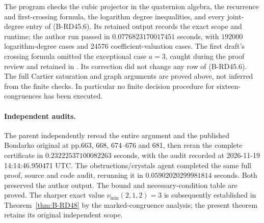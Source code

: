 \begin{remark}
The program 
checks the cubic projector in the quaternion algebra, the
recurrence and first-crossing formula, the logarithm degree
inequalities, and every joint-degree entry of (B-RD45.6).
Its retained output records the exact scope and runtime; the
author run passed in $0.0776823170017451$ seconds, with
$192000$ logarithm-degree cases and $24576$ coefficient-valuation
cases. The first draft's crossing formula omitted the exceptional
case $a=3$, caught during the proof review and retained in
.
Its correction did not change any row of (B-RD45.6).
The full Cartier saturation and graph arguments are proved
above, not inferred from the finite checks. In particular
no finite decision procedure for sixteen-congruences has
been executed.
\end{remark}

\paragraph{Independent audits.}
The parent independently reread the entire argument and the published
Bondarko original at pp.663, 668, 674--676 and 681, then reran the
complete certificate in $0.23222537100082263$ seconds, with the
audit recorded at 2026-11-19 14:14:46.950471 UTC.
The obstructions/crystals agent completed the same full proof,
source and code audit, rerunning it in $0.05902020299981814$ seconds.
Both preserved the author output. The bound and necessary-condition
table are proved. The sharper exact value
$\nu_{\min}(2,1,2)=3$ is subsequently established in
Theorem~\ref{thm:B-RD48} by the marked-congruence analysis;
the present theorem retains its original independent scope.
